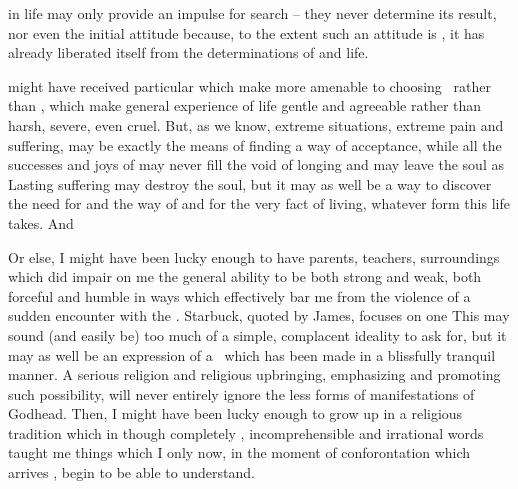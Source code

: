 \pa
{} in life may only provide an impulse for
 search -- they never determine its result, nor even the
initial attitude because, to the extent such an attitude is
, it has already liberated itself from the
determinations of  and life.

 might have
received particular  which make  more
amenable to choosing \yes\ rather than \No, which make  general
experience of life gentle and agreeable rather than harsh, severe,
even cruel. 
But, as we know, extreme situations,
extreme pain and suffering, may be exactly the means of finding a way
of  acceptance, while all the successes and joys of
 may never fill the void of longing and may leave the
soul  as 
 Lasting suffering may destroy the 
soul, but it may as well be a way to discover the need for and the way 
of  and  for the very fact of 
living, whatever form this life takes. And 

Or else, I might have been lucky enough to have parents, teachers,
surroundings which did impair on me the general ability to be both
strong and weak, both forceful and humble in ways which effectively
bar me from the violence of a sudden encounter with the
.  Starbuck, quoted by James, focuses on one  This may sound (and easily be) too much of a simple, complacent
ideality to ask for, but it may as well be an expression of a \sch\
which has been made in a blissfully tranquil manner.  A serious 
religion and 
religious upbringing, emphasizing and promoting such possibility, will never
entirely ignore the less \thi{rational} forms of manifestations of
Godhead.  Then, I might have been lucky enough to grow up in
a religious tradition which in  though completely
, incomprehensible and irrational words taught me things
which I only now, in the moment of conforontation which arrives
, begin to be able to understand.


